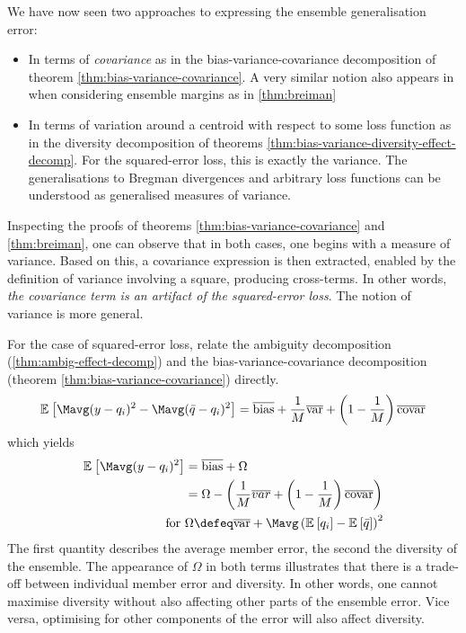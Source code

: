 \documentclass[../main.tex]{subfiles}
\begin{document}
We have now seen two approaches to expressing the ensemble generalisation error:
\begin{itemize}
\item In terms of \textit{covariance} as in the bias-variance-covariance decomposition of theorem \ref{thm:bias-variance-covariance}. A very similar notion also appears in when considering ensemble margins as in \ref{thm:breiman}
\item In terms of variation around a centroid with respect to some loss function as in the diversity decomposition of theorems \ref{thm:bias-variance-diversity-effect-decomp}. For the squared-error loss, this is exactly the variance. The generalisations to Bregman divergences and arbitrary loss functions can be understood as generalised measures of variance. 
\end{itemize}
Inspecting the proofs of theorems \ref{thm:bias-variance-covariance} and \ref{thm:breiman}, one can observe that in both cases, one begins with a measure of variance. Based on this, a covariance expression is then extracted, enabled by the definition of variance involving a square, producing cross-terms.
In other words, \textit{the covariance term is an artifact of the squared-error loss}. The notion of variance is more general.

For the case of squared-error loss, \citeauthor{brown_ManagingDiversityRegression_2005} \cite{brown_ManagingDiversityRegression_2005} relate the ambiguity decomposition (\ref{thm:ambig-effect-decomp}) and the bias-variance-covariance decomposition (theorem \ref{thm:bias-variance-covariance}) directly. 
\begin{align*}
\mathbb{E}_{}\left[ \Mavg (y - q_{i})^2 - \Mavg (\bar{q} - q_{i})^2 \right]  = \overline{\text{bias} } + \frac{1}{M} \overline{\text{var} } + \left( 1 - \frac{1}{M} \right) \overline{\text{covar} }
\end{align*}
which yields
\begin{align*}
\mathbb{E}_{}\left[ \Mavg (y - q_{i})^2 \right]  &= \overline{\text{bias} } + \Omega \\
&= \Omega - \left( \frac{1}{M}\overline{var} + \left( 1-\frac{1}{M} \right) \overline{\text{covar} } \right) \\
\text{for~}  & \Omega \defeq \overline{\text{var} } + \Mavg \left( \mathbb{E}_{}\left[ q_{i} \right] - \mathbb{E}_{}\left[ \bar{q} \right] \right)^2
\end{align*}
The first quantity describes the average member error, the second the diversity of the ensemble. The appearance of $\Omega$ in both terms illustrates that there is a trade-off between individual member error and diversity. 
In other words, one cannot maximise diversity without also affecting other parts of the ensemble error. Vice versa, optimising for other components of the error will also affect diversity.
\end{document}
